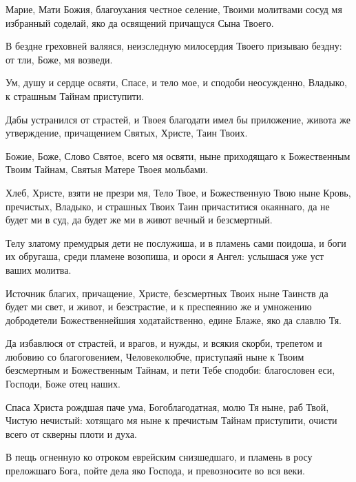 
Марие, Мати Божия, благоухания честное селение, Твоими молитвами сосуд мя избранный соделай, яко да освящений причащуся Сына Твоего.




В бездне греховней валяяся, неизследную милосердия Твоего призываю бездну: от тли, Боже, мя возведи.


Ум, душу и сердце освяти, Спасе, и тело мое, и сподоби неосужденно, Владыко, к страшным Тайнам приступити.


Дабы устранился от страстей, и Твоея благодати имел бы приложение, живота же утверждение, причащением Святых, Христе, Таин Твоих.



Божие, Боже, Слово Святое, всего мя освяти, ныне приходящаго к Божественным Твоим Тайнам, Святыя Матере Твоея мольбами.




Хлеб, Христе, взяти не презри мя, Тело Твое, и Божественную Твою ныне Кровь, пречистых, Владыко, и страшных Твоих Таин причаститися окаяннаго, да не будет ми в суд, да будет же ми в живот вечный и безсмертный.




Телу златому премудрыя дети не послужиша, и в пламень сами поидоша, и боги их обругаша, среди пламене возопиша, и ороси я Ангел: услышася уже уст ваших молитва.


Источник благих, причащение, Христе, безсмертных Твоих ныне Таинств да будет ми свет, и живот, и безстрастие, и к преспеянию же и умножению добродетели Божественнейшия ходатайственно, едине Блаже, яко да славлю Тя.


Да избавлюся от страстей, и врагов, и нужды, и всякия скорби, трепетом и любовию со благоговением, Человеколюбче, приступаяй ныне к Твоим безсмертным и Божественным Тайнам, и пети Тебе сподоби: благословен еси, Господи, Боже отец наших.



Спаса Христа рождшая паче ума, Богоблагодатная, молю Тя ныне, раб Твой, Чистую нечистый: хотящаго мя ныне к пречистым Тайнам приступити, очисти всего от скверны плоти и духа.




В пещь огненную ко отроком еврейским снизшедшаго, и пламень в росу преложшаго Бога, пойте дела яко Господа, и превозносите во вся веки.


